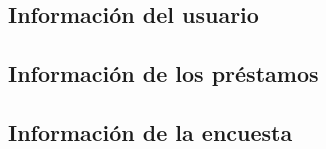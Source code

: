 \subsection{Información del usuario}

\subsection{Información de los préstamos}

\subsection{Información de la encuesta}
